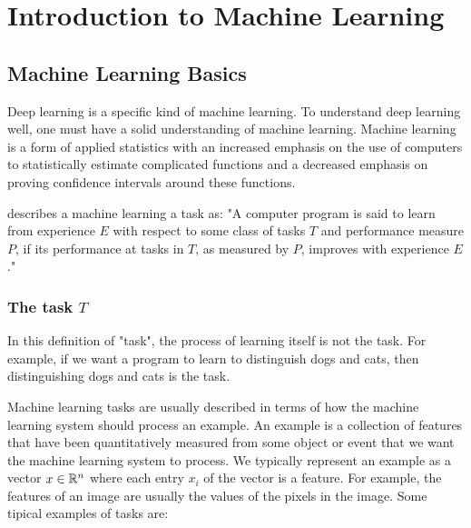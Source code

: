 
\chapter{Introduction to Machine Learning} %

\label{Chapter2} %


\section{Machine Learning Basics}

Deep learning is a specific kind of machine learning. To understand deep learning well, one must have a solid understanding of machine learning. Machine learning is a form of applied statistics with an increased emphasis on the use of computers to statistically estimate complicated functions and a decreased emphasis on proving confidence intervals around these functions.

\parencite{machine-learning} describes a machine learning a task as: "A computer program is said to learn from experience \(E\) with respect to some class of tasks \(T\) and performance measure \(P\), if its performance at tasks in \(T\), as measured by \(P\), improves with experience \(E\)."

\subsection{The task \(T\)}

In this definition of "task", the process of learning itself is not the task. For example, if we want a program to learn to distinguish dogs and cats, then distinguishing dogs and cats is the task.

Machine learning tasks are usually described in terms of how the machine learning system should process an example. An example is a collection of features that have been quantitatively measured from some object or event that we want the machine learning system to process. We typically represent an example as a vector \(x \in \mathbb R^n\) where each entry \(x_i\) of the vector is a feature. For example, the features of an image are usually the values of the pixels in the image. Some tipical examples of tasks are:


